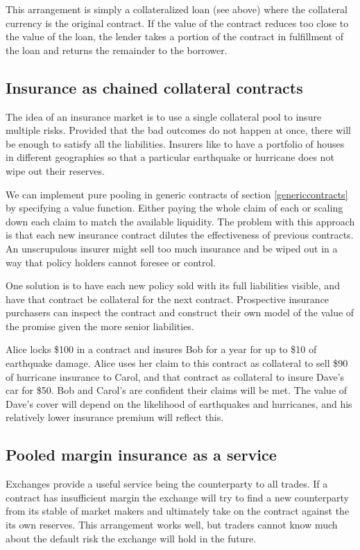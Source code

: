 \documentclass[12pt]{article}
\begin{document}
This  arrangement is simply a collateralized loan (see above) where the collateral currency is the original contract. If the value of the contract reduces too close to the value of the loan, the lender takes a portion of the contract in fulfillment of the loan and returns the remainder to the borrower.

\subsection{Insurance as chained collateral contracts}

The idea of an insurance market is to use a single collateral pool to insure multiple risks. Provided that the bad outcomes do not happen at once, there will be enough to satisfy all the liabilities. Insurers like to have a portfolio of houses in different geographies so that a particular earthquake or hurricane does not wipe out their reserves.

We can implement pure pooling in generic contracts of section \ref{genericcontracts} by specifying a value function. Either paying the whole claim of each or scaling down each claim to match the available liquidity. The problem with this approach is that each new insurance contract dilutes the effectiveness of previous contracts. An unscrupulous insurer might sell too much insurance and be wiped out in a way that policy holders cannot foresee or control.

One solution is to have each new policy sold with its full liabilities visible, and have that contract be collateral for the next contract. Prospective insurance purchasers can inspect the contract and construct their own model of the value of the promise given the more senior liabilities.

Alice locks \$100 in a contract and insures Bob for a year for up to \$10 of earthquake damage. Alice uses her claim to this contract as collateral to sell  \$90 of hurricane insurance to Carol, and that contract as collateral to insure Dave's car for \$50. Bob and Carol's are confident their claims will be met. The value of Dave's cover will depend on the likelihood of earthquakes and hurricanes, and his relatively lower insurance premium will reflect this. 


\subsection{Pooled margin insurance as a service}

Exchanges provide a useful service being the counterparty to all trades. If a contract has insufficient margin the exchange will try to find a new counterparty from its stable of market makers and ultimately take on the contract against the its own reserves. This arrangement works well, but traders cannot know much about the default risk the exchange will hold in the future. 
\end{document}
